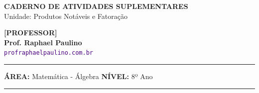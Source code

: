 \noindent
\begin{minipage}{\textwidth}
    \selectfont
    \noindent
    \begin{minipage}[t]{0.65\linewidth}
        {\Large \bfseries \MakeUppercase{Caderno de Atividades Suplementares}}\\[0.1cm]
        {\large \textmd{\textcolor{CinzaEscuro}{Unidade: Produtos Notáveis e Fatoração}}}
    \end{minipage}%
    \begin{minipage}[t]{0.35\linewidth}
        \raggedleft
        \ifgabarito
            {\large \bfseries \textcolor{CorTitUm}{[PROFESSOR]}}\\[0.05cm]
        \fi
        \small \textbf{Prof. Raphael Paulino}\\
        \textsf{\small \textcolor{indigo}{\texttt{profraphaelpaulino.com.br}}}
    \end{minipage}
    
    \vspace{0.15cm}
    \noindent\rule{\linewidth}{1.2pt}
    \vspace{-0.1cm}
    \footnotesize\textsf{\textbf{ÁREA:} Matemática - Álgebra \hfill \textbf{NÍVEL:} 8º Ano}
    \vspace{0.1cm}
    \noindent\rule{\linewidth}{0.4pt}
\end{minipage}


